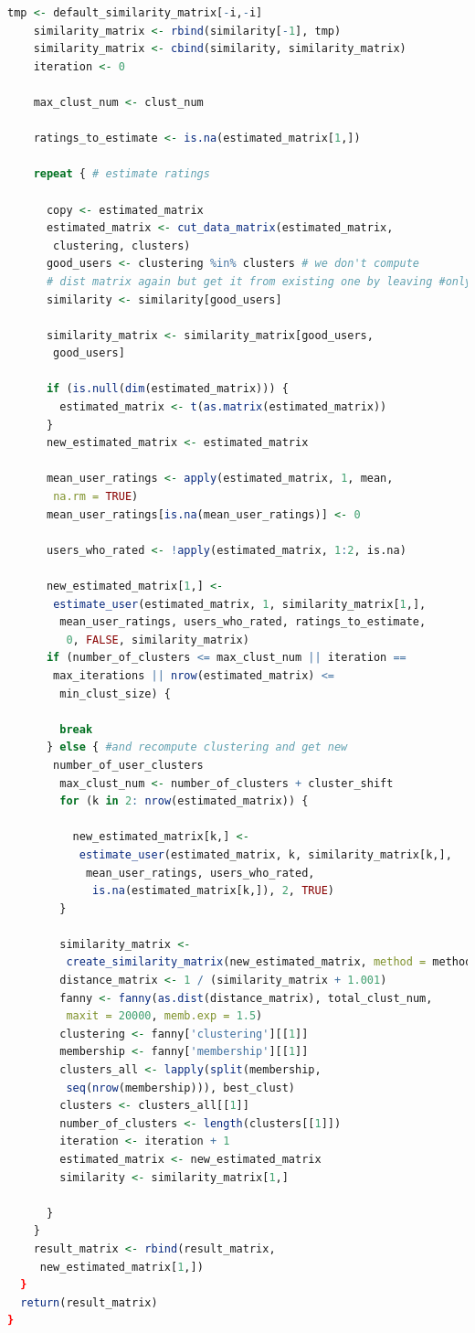 \documentclass[a4paper, 12pt]{article} %
\begin{document}
\begin{lstlisting}[language=R]
    tmp <- default_similarity_matrix[-i,-i]
    similarity_matrix <- rbind(similarity[-1], tmp)
    similarity_matrix <- cbind(similarity, similarity_matrix)
    iteration <- 0
    
    max_clust_num <- clust_num
    
    ratings_to_estimate <- is.na(estimated_matrix[1,])
    
    repeat { # estimate ratings 

      copy <- estimated_matrix
      estimated_matrix <- cut_data_matrix(estimated_matrix,
       clustering, clusters)
      good_users <- clustering %in% clusters # we don't compute
      # dist matrix again but get it from existing one by leaving #only those users who are in good clusters 
      similarity <- similarity[good_users]

      similarity_matrix <- similarity_matrix[good_users,
       good_users] 

      if (is.null(dim(estimated_matrix))) {
        estimated_matrix <- t(as.matrix(estimated_matrix))
      }
      new_estimated_matrix <- estimated_matrix

      mean_user_ratings <- apply(estimated_matrix, 1, mean,
       na.rm = TRUE)
      mean_user_ratings[is.na(mean_user_ratings)] <- 0 
      
      users_who_rated <- !apply(estimated_matrix, 1:2, is.na)
      
      new_estimated_matrix[1,] <-
       estimate_user(estimated_matrix, 1, similarity_matrix[1,],
        mean_user_ratings, users_who_rated, ratings_to_estimate,
         0, FALSE, similarity_matrix) 
      if (number_of_clusters <= max_clust_num || iteration ==
       max_iterations || nrow(estimated_matrix) <=
        min_clust_size) { 

        break
      } else { #and recompute clustering and get new
       number_of_user_clusters
        max_clust_num <- number_of_clusters + cluster_shift
        for (k in 2: nrow(estimated_matrix)) {

          new_estimated_matrix[k,] <-
           estimate_user(estimated_matrix, k, similarity_matrix[k,],
            mean_user_ratings, users_who_rated,
             is.na(estimated_matrix[k,]), 2, TRUE)
        }
        
        similarity_matrix <-
         create_similarity_matrix(new_estimated_matrix, method = method)
        distance_matrix <- 1 / (similarity_matrix + 1.001)
        fanny <- fanny(as.dist(distance_matrix), total_clust_num,
         maxit = 20000, memb.exp = 1.5)
        clustering <- fanny['clustering'][[1]]
        membership <- fanny['membership'][[1]]
        clusters_all <- lapply(split(membership,
         seq(nrow(membership))), best_clust)
        clusters <- clusters_all[[1]]
        number_of_clusters <- length(clusters[[1]])
        iteration <- iteration + 1
        estimated_matrix <- new_estimated_matrix
        similarity <- similarity_matrix[1,]
        
      } 
    }
    result_matrix <- rbind(result_matrix,
     new_estimated_matrix[1,])
  }
  return(result_matrix) 
}
\end{lstlisting}
\end{document}
